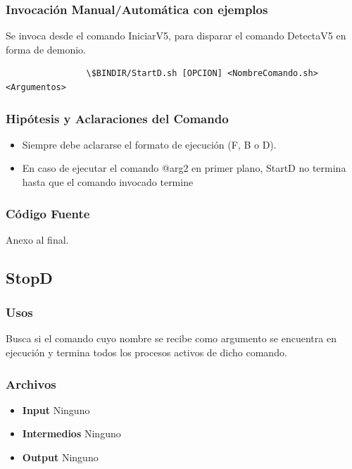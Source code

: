 \documentclass[a4paper,10pt,titlepage]{article}
\begin{document}
		\subsubsection{Invocaci\'on Manual/Autom\'atica con ejemplos}
			Se invoca desde el comando IniciarV5, para disparar el comando DetectaV5 en forma de demonio.
				
			\begin{verbatim}
				\$BINDIR/StartD.sh [OPCION] <NombreComando.sh> <Argumentos>
			\end{verbatim}

		\subsubsection{Hip\'otesis y Aclaraciones del Comando}
			\begin{itemize}
				\item {}{Siempre debe aclararse el formato de ejecuci\'on (F, B o D).}
				\item{}{En caso de ejecutar el comando @arg2 en primer plano, StartD no termina hasta que el comando invocado termine}

			\end{itemize}


		\subsubsection{C\'odigo Fuente}
			Anexo al final.


	\subsection{StopD}
		\subsubsection{Usos}

		Busca si el comando cuyo nombre se recibe como argumento se encuentra en ejecuci\'on y termina todos los procesos activos de dicho comando.


		\subsubsection{Archivos}
			\begin {itemize}
				\item \textbf{Input } {Ninguno}
				\item \textbf{Intermedios } {Ninguno}
				\item \textbf{Output } {Ninguno}
			\end{itemize}
\end{document}
